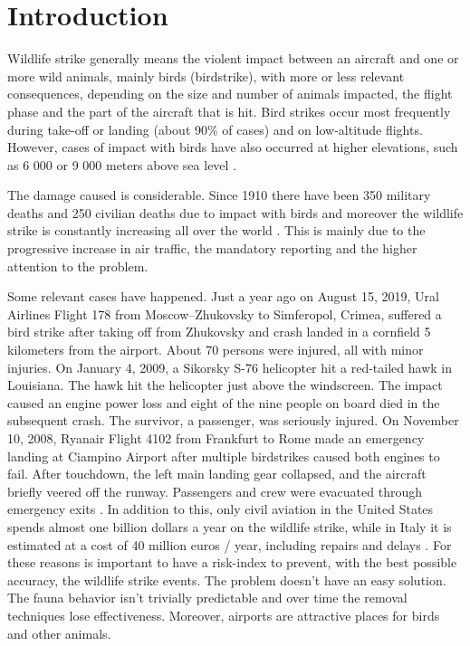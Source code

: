 \chapter{Introduction}\label{ch:Ch.1}

Wildlife strike generally means the violent impact between an aircraft and one or more wild animals, mainly birds (birdstrike), with more or less relevant consequences, depending on the size and number of animals impacted, the flight phase and the part of the aircraft that is hit.
Bird strikes occur most frequently during take-off or landing (about 90\% of cases) and on low-altitude flights. However, cases of impact with birds have also occurred at higher elevations, such as 6 000 or 9 000 meters above sea level \cite{wikipedia_it}.

The damage caused is considerable. Since 1910 there have been 350 military deaths and 250 civilian deaths due to impact with birds and moreover the wildlife strike is constantly increasing all over the world \cite{wikipedia_it}. This is mainly due to the progressive increase in air traffic, the mandatory reporting and the higher attention to the problem.

Some relevant cases have happened. Just a year ago on August 15, 2019, Ural Airlines Flight 178 from Moscow–Zhukovsky to Simferopol, Crimea, suffered a bird strike after taking off from Zhukovsky and crash landed in a cornfield 5 kilometers from the airport. About 70 persons were injured, all with minor injuries.
On January 4, 2009, a Sikorsky S-76 helicopter hit a red-tailed hawk in Louisiana. The hawk hit the helicopter just above the windscreen. The impact caused an engine power loss and eight of the nine people on board died in the subsequent crash. The survivor, a passenger, was seriously injured.
On November 10, 2008, Ryanair Flight 4102 from Frankfurt to Rome made an emergency landing at Ciampino Airport after multiple birdstrikes caused both engines to fail. After touchdown, the left main landing gear collapsed, and the aircraft briefly veered off the runway. Passengers and crew were evacuated through emergency exits \cite{wikipedia_en}.
In addition to this, only civil aviation in the United States spends almost one billion dollars a year on the wildlife strike, while in Italy it is estimated at a cost of 40 million euros / year, including repairs and delays \cite{ENAC-Wildlifestrike}.
For these reasons is important to have a risk-index to prevent, with the best possible accuracy, the wildlife strike events.
The problem doesn’t have an easy solution. The fauna behavior isn’t trivially predictable and over time the removal techniques lose effectiveness. Moreover, airports are attractive places for birds and other animals.

